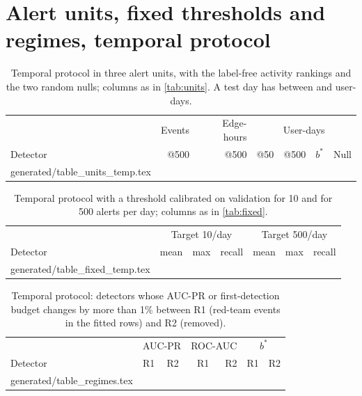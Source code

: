 \documentclass[11pt,a4paper]{article}
\makeatletter
\newcommand{\tablerows}[1]{\@@input #1 }
\makeatother
\begin{document}
\section{Alert units, fixed thresholds and regimes, temporal protocol}
\label{app:units}
\begin{table}[H]
\centering
\footnotesize
\setlength{\tabcolsep}{4pt}
\caption{Temporal protocol in three alert units, with the label-free activity rankings and the two random nulls; columns as in \cref{tab:units}. A test day has between \TempUserDaysMin{} and \TempUserDaysMax{} user-days.}
\label{tab:units-temp}
\begin{tabular}{@{}lrrrrrr@{}}
\toprule
& Events & Edge-hours & \multicolumn{4}{c}{User-days} \\
Detector & @500 & @500 & @50 & @500 & $b^{*}$ & Null \\
\midrule
\tablerows{generated/table_units_temp.tex}
\bottomrule
\end{tabular}
\end{table}
\begin{table}[H]
\centering
\footnotesize
\caption{Temporal protocol with a threshold calibrated on validation for 10 and for 500 alerts per day; columns as in \cref{tab:fixed}.}
\label{tab:fixed-temp}
\begin{tabular}{@{}lrrrrrr@{}}
\toprule
& \multicolumn{3}{c}{Target 10/day} & \multicolumn{3}{c}{Target 500/day} \\
Detector & mean & max & recall & mean & max & recall \\
\midrule
\tablerows{generated/table_fixed_temp.tex}
\bottomrule
\end{tabular}
\end{table}
\begin{table}[H]
\centering
\small
\caption{Temporal protocol: detectors whose AUC-PR or first-detection budget changes by more than 1\% between R1 (red-team events in the fitted rows) and R2 (removed).}
\label{tab:regimes}
\begin{tabular}{@{}lllrrrr@{}}
\toprule
& \multicolumn{2}{c}{AUC-PR} & \multicolumn{2}{c}{ROC-AUC} & \multicolumn{2}{c}{$b^{*}$} \\
Detector & R1 & R2 & R1 & R2 & R1 & R2 \\
\midrule
\tablerows{generated/table_regimes.tex}
\bottomrule
\end{tabular}
\end{table}
\end{document}
